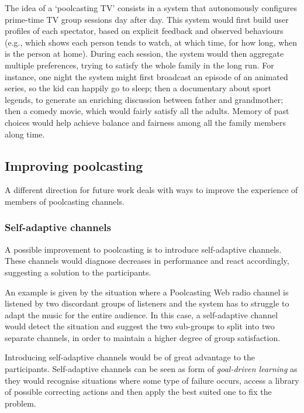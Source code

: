 The idea of a `poolcasting TV' consists in a system that autonomously configures prime-time TV group sessions day after day. 
This system would first build user profiles of each spectator, based on explicit feedback and observed behaviours (e.g., which shows each person tends to watch, at which time, for how long, when is the person at home).
During each session, the system would then aggregate multiple preferences, trying to satisfy the whole family in the long run.
For instance, one night the system might first broadcast an episode of an animated series, so the kid can happily go to sleep; then a documentary about sport legends, to generate an enriching discussion between father and grandmother; then a comedy movie, which would fairly satisfy all the adults.
Memory of past choices would help achieve balance and fairness among all the family members along time.

\subsection{Improving poolcasting} %
\label{sub:improving_the_quality_of_music_channels}

A different direction for future work deals with ways to improve the experience of members of poolcasting channels.

\subsubsection{Self-adaptive channels} %

A possible improvement to poolcasting is to introduce self-adaptive channels. These channels would diagnose decreases in performance and react accordingly, suggesting a solution to the participants. 

An example is given by the situation where a Poolcasting Web radio channel is listened by two discordant groups of listeners and the system has to struggle to adapt the music for the entire audience. 
In this case, a self-adaptive channel would detect the situation and suggest the two sub-groups to split into two separate channels, in order to maintain a higher degree of group satisfaction.

Introducing self-adaptive channels would be of great advantage to the participants. 
Self-adaptive channels can be seen as form of \emph{goal-driven learning} \cite{Leake93} as they would recognise situations where some type of failure occurs, access a library of possible correcting actions and then apply the best suited one to fix the problem. 

